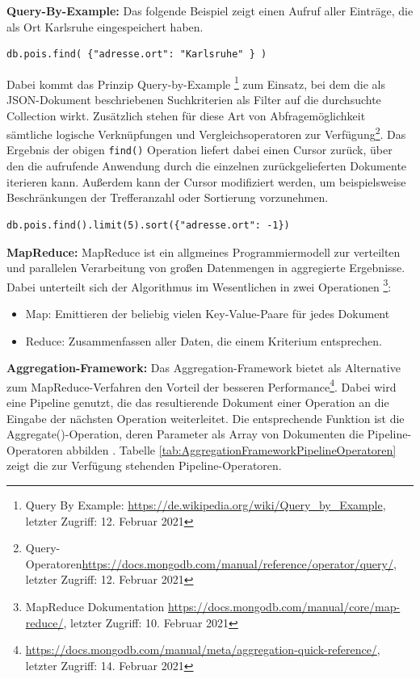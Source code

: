 \noindent
\textbf{Query-By-Example:}
Das folgende Beispiel zeigt einen Aufruf aller Einträge, die als Ort Karlsruhe eingespeichert haben. 
\newline
\begin{lstlisting}[caption=MongoDB Read, label=lst:MongoDBRead]
db.pois.find( {"adresse.ort": "Karlsruhe" } )
\end{lstlisting}

\noindent
Dabei kommt das Prinzip Query-by-Example \footnote{Query By Example: \url{https://de.wikipedia.org/wiki/Query_by_Example}, letzter Zugriff: 12. Februar 2021} zum Einsatz, bei dem die als JSON-Dokument beschriebenen Suchkriterien als Filter auf die durchsuchte Collection wirkt. Zusätzlich stehen für diese Art von Abfragemöglichkeit sämtliche logische Verknüpfungen und Vergleichsoperatoren zur Verfügung\footnote{Query-Operatoren\url{https://docs.mongodb.com/manual/reference/operator/query/}, letzter Zugriff: 12. Februar 2021}.
Das Ergebnis der obigen \texttt{find()} Operation liefert dabei einen Cursor zurück, über den die aufrufende Anwendung durch die einzelnen zurückgelieferten Dokumente iterieren kann. Außerdem kann der Cursor modifiziert werden, um beispielsweise Beschränkungen der Trefferanzahl oder Sortierung vorzunehmen. \\

\begin{lstlisting}[caption=MongoDB Read Modifikation, label=lst:MongoDBReadModifikation]
db.pois.find().limit(5).sort({"adresse.ort": -1})
\end{lstlisting}

\noindent
\textbf{MapReduce:}
MapReduce ist ein allgmeines Programmiermodell zur verteilten und parallelen Verarbeitung von großen Datenmengen in aggregierte Ergebnisse. Dabei unterteilt sich der Algorithmus im Wesentlichen in zwei Operationen \footnote{MapReduce Dokumentation \url{https://docs.mongodb.com/manual/core/map-reduce/}, letzter Zugriff: 10. Februar 2021}:

\begin{itemize}
	\item Map: Emittieren der beliebig vielen Key-Value-Paare für jedes Dokument
	\item Reduce: Zusammenfassen aller Daten, die einem Kriterium entsprechen.
\end{itemize}

\noindent
\textbf{Aggregation-Framework:}
Das Aggregation-Framework bietet als Alternative zum MapReduce-Verfahren den Vorteil der besseren Performance\footnote{\url{https://docs.mongodb.com/manual/meta/aggregation-quick-reference/}, letzter Zugriff: 14. Februar 2021}. Dabei wird eine Pipeline genutzt, die das resultierende Dokument einer Operation an die Eingabe der nächsten Operation weiterleitet. Die entsprechende Funktion ist die Aggregate()-Operation, deren Parameter als Array von Dokumenten die Pipeline-Operatoren abbilden . Tabelle \ref{tab:AggregationFrameworkPipelineOperatoren} zeigt die zur Verfügung stehenden Pipeline-Operatoren.\\

